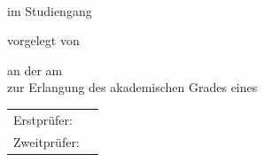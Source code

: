 \begin{titlepage}
  \centering


  \vspace{20mm}
  {\huge{\getDoctype{}}}\\

  \vspace*{5mm}
  {\large im Studiengang \getCourseOfStudies{}}

  \vspace{15mm}
  {\huge\bfseries \getTitle{}}

  \vspace*{15mm}
  vorgelegt von 

  \vspace{5mm}
  {\large \getAuthor{}} 

  \vspace{5mm}
  an der \getUniversity{} 
  am \getSubmissionDate{} \\
  zur Erlangung des akademischen Grades eines \getAcademicDegree{}

  \vspace{15mm}
  \begin{tabular}{l l}
    Erstprüfer:      & \getSupervisor{} \\
    Zweitprüfer:     & \getAdvisor{} \\
  \end{tabular}

\end{titlepage}
